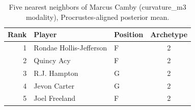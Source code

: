 \begin{table}[htbp]
  \centering\small
  \begin{tabular}{rllc}
    \toprule
    Rank & Player & Position & Archetype \\
    \midrule
    1 & Rondae Hollis-Jefferson & F & 2 \\
    2 & Quincy Acy & F & 2 \\
    3 & R.J. Hampton & G & 2 \\
    4 & Jevon Carter & G & 2 \\
    5 & Joel Freeland & F & 2 \\
    \bottomrule
  \end{tabular}
  \caption{Five nearest neighbors of Marcus Camby (curvature_m3 modality), Procrustes-aligned posterior mean.}
  \label{tab:Marcus_Camby_neighbors_curvature_m3}
\end{table}


